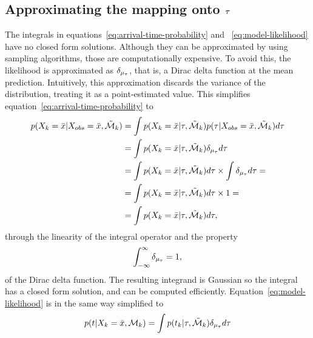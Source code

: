 \subsection{Approximating the mapping onto $\tau$}
The integrals in equations~\ref{eq:arrival-time-probability} and
~\ref{eq:model-likelihood} have no closed form solutions.
Although they can be approximated by using sampling algorithms,
those are computationally expensive. To
avoid this, the likelihood is approximated as
$\delta_{\mu_{\tau}}$, that is, a Dirac delta function at the
mean prediction. Intuitively, this approximation discards the variance
of the distribution, treating it as a point-estimated value.
This simplifies equation~\ref{eq:arrival-time-probability} to
\begin{equation}
  \begin{split}
    p(X_{k} = \bar{x} \vert X_{obs} = \bar{x},
    \tilde{\mathcal{M}}_{k}) & = 
    \int p(X_{k} = \bar{x} \vert \tau, \tilde{\mathcal{M}}_{k}) 
    p(\tau \vert X_{obs} = \bar{x},
    \tilde{\mathcal{M}}_{k}) d\tau \\
    & = \int p(X_{k} = \bar{x} \vert \tau, \tilde{\mathcal{M}}_{k}) 
    \delta_{\mu_{\tau}} d\tau \\
    & = \int p(X_{k} = \bar{x} \vert \tau, \tilde{\mathcal{M}}_{k}) d\tau
    \times \int \delta_{\mu_{\tau}} d\tau = \\
    & = \int p(X_{k} = \bar{x} \vert \tau,
    \tilde{\mathcal{M}}_{k}) d\tau \times 1 = \\
    & = \int p(X_{k} = \bar{x} \vert \tau,
    \tilde{\mathcal{M}}_{k}) d\tau,
  \end{split}
\end{equation}
through the linearity of the integral operator and the property
\begin{equation}
  \label{eq:dirac-integral}
  \int_{-\infty}^{\infty} \delta_{\mu_{\tau}} = 1,
\end{equation}
of the Dirac delta function. The resulting integrand is Gaussian
so the integral has a closed form solution, and can be computed
efficiently. Equation~\ref{eq:model-likelihood} is in the same way
simplified to
\begin{equation}
  \begin{split}
    p(t \vert X_k = \bar{x}, \mathcal{M}_{k}) =
    \int p(t_k | \tau, \tilde{\mathcal{M}}_k) \delta_{\mu_{\tau}} d\tau
  \end{split}
\end{equation}

